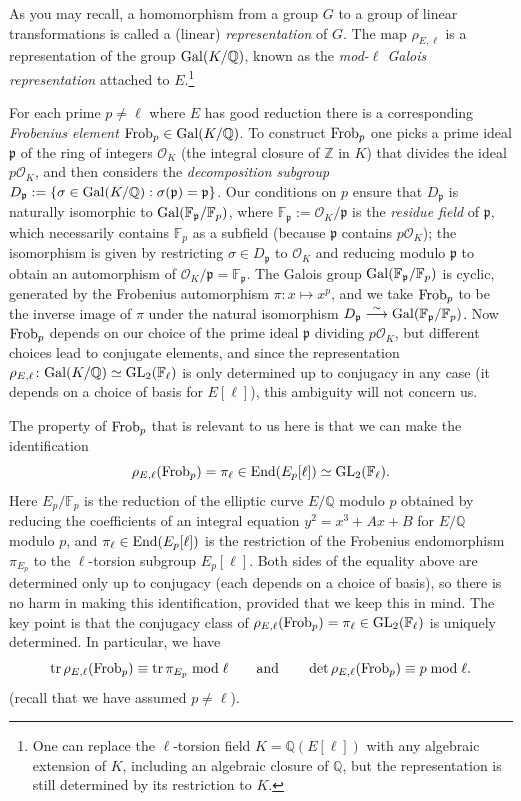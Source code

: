 \documentclass[11pt]{article}
\newcommand{\Fl}{\mathbb{F}_\ell}
\newcommand{\Fp}{\mathbb{F}_p}
\newcommand{\FF}{\mathbb{F}}
\newcommand{\Q}{\mathbb{Q}}
\newcommand{\Z}{\mathbb{Z}}
\renewcommand{\O}{\mathcal{O}}
\newcommand{\End}{{\rm End}}
\newcommand{\Gal}{{\rm Gal}}
\newcommand{\GL}{{\rm GL}}
\newcommand{\p}{\mathfrak{p}}
\newcommand{\Frob}{{\rm Frob}}
\newcommand{\tr}{\operatorname{tr}}
\theoremstyle{definition}
\begin{document}
As you may recall, a homomorphism from a group $G$ to a group of linear transformations is called a (linear) \emph{representation} of $G$.
The map $\rho_{E,\ell}$ is a representation of the group $\Gal(K/\Q)$, known as the \emph{mod-$\ell$ Galois representation} attached to $E$.\footnote{One can replace the $\ell$-torsion field $K=\Q(E[\ell])$ with any algebraic extension of $K$, including an algebraic closure of $\Q$, but the representation is still determined by its restriction to $K$.}

For each prime $p\ne\ell$ where $E$ has good reduction there is a corresponding \emph{Frobenius element} $\Frob_p\in \Gal(K/\Q)$.  To construct $\Frob_p$ one picks a prime ideal $\p$ of the ring of integers $\O_K$ (the integral closure of $\Z$ in $K$) that divides the ideal $p\O_K$, and then considers the \emph{decomposition subgroup} $D_\p :=\{\sigma\in \Gal(K/\Q):\sigma(\p)=\p\}$.  Our conditions on $p$ ensure that $D_\p$ is naturally isomorphic to $\Gal(\FF_\p/\Fp)$, where $\FF_\p:=\O_K/\p$ is the \emph{residue field} of $\p$, which necessarily contains $\Fp$ as a subfield (because $\p$ contains $p\O_K$); the isomorphism is given by restricting $\sigma\in D_\p$ to $\O_K$ and reducing modulo $\p$ to obtain an automorphism of $\O_K/\p=\FF_\p$.
The Galois group $\Gal(\FF_\p/\Fp)$ is cyclic, generated by the Frobenius automorphism $\pi\colon x\mapsto x^p$, and we take $\Frob_p$ to be the inverse image of $\pi$ under the natural isomorphism $D_\p\overset{\sim}{\longrightarrow}\Gal(\FF_\p/\Fp)$.
Now $\Frob_p$ depends on our choice of the prime ideal $\p$ dividing $p\O_K$, but different choices lead to conjugate elements, and since the representation $\rho_{E,\ell}\colon \Gal(K/\Q)\simeq\GL_2(\Fl)$ is only determined up to conjugacy in any case (it depends on a choice of basis for $E[\ell]$), this ambiguity will not concern us.

The property of $\Frob_p$ that is relevant to us here is that we can make the identification
\[
\rho_{E,\ell}(\Frob_p)=\pi_\ell\in\End(E_p[\ell])\simeq \GL_2(\Fl).
\]
Here $E_p/\Fp$ is the reduction of the elliptic curve $E/\Q$ modulo $p$ obtained by reducing the coefficients of an integral equation $y^2=x^3+Ax+B$ for $E/\Q$ modulo $p$, and $\pi_\ell\in \End(E_p[\ell])$ is the restriction of the Frobenius endomorphism $\pi_{E_p}$ to the $\ell$-torsion subgroup $E_p[\ell]$.
Both sides of the equality above are determined only up to conjugacy (each depends on a choice of basis), so there is no harm in making this identification, provided that we keep this in mind.
The key point is that the conjugacy class of $\rho_{E,\ell}(\Frob_p)=\pi_\ell\in\GL_2(\Fl)$ is uniquely determined.
In particular, we have
\[
\tr \rho_{E,\ell}(\Frob_p)\equiv \tr \pi_{E_p}\bmod \ell\qquad\text{and}\qquad \det\rho_{E,\ell}(\Frob_p)\equiv p\bmod \ell.
\]
(recall that we have assumed $p\ne \ell$).
\end{document}
